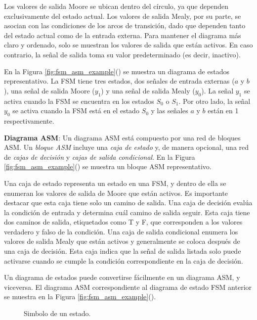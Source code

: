     Los valores de salida Moore se ubican dentro del círculo, ya que dependen exclusivamente del estado actual. Los valores de salida Mealy, por su parte, se asocian con las condiciones de los arcos de transición, dado que dependen tanto del estado actual como de la entrada externa. Para mantener el diagrama más claro y ordenado, solo se muestran los valores de salida que están activos. En caso contrario, la señal de salida toma su valor predeterminado (es decir, inactivo).

    En la Figura \ref{fig:fsm_asm_example}() se muestra un diagrama de estados representativo. La FSM tiene tres estados, dos señales de entrada externas ($a$ y $b$), una señal de salida Moore ($y_{1}$) y una señal de salida Mealy ($y_{0}$). La señal $y_{1}$ se activa cuando la FSM se encuentra en los estados $S_{0}$ o $S_{1}$. Por otro lado, la señal $y_{0}$ se activa cuando la FSM está en el estado $S_{0}$ y las señales $a$ y $b$ están en 1 respectivamente.

    \textbf{Diagrama ASM}: Un diagrama ASM está compuesto por una red de bloques ASM. Un \textit{bloque ASM} incluye una \textit{caja de estado} y, de manera opcional, una red de \textit{cajas de decisión} y \textit{cajas de salida condicional}. En la Figura \ref{fig:fsm_asm_example}() se muestra un bloque ASM representativo.

    Una caja de estado representa un estado en una FSM, y dentro de ella se enumeran los valores de salida de Moore que están activos. Es importante destacar que esta caja tiene solo un camino de salida. Una caja de decisión evalúa la condición de entrada y determina cuál camino de salida seguir. Esta caja tiene dos caminos de salida, etiquetados como T y F, que corresponden a los valores verdadero y falso de la condición. Una caja de salida condicional enumera los valores de salida Mealy que están activos y generalmente se coloca después de una caja de decisión. Esta caja indica que la señal de salida listada solo puede activarse cuando se cumple la condición correspondiente en la caja de decisión.

    Un diagrama de estados puede convertirse fácilmente en un diagrama ASM, y viceversa. El diagrama ASM correspondiente al diagrama de estado FSM anterior se muestra en la Figura \ref{fig:fsm_asm_example}().

    \begin{figure}[!h]
        \centering
        \caption{Simbolo de un estado.}
        \label{fig:node_asm_diagram}
    \end{figure}

